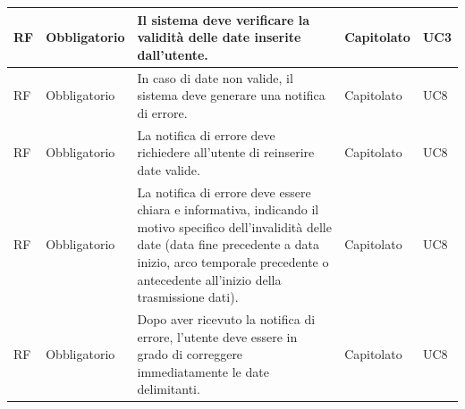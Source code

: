 \documentclass{article}
\begin{document}
\begin{longtable}{|C{1cm}|C{2cm}|>{\raggedright}m{5cm}|C{1.5cm}|C{2cm}|}
     RF & Obbligatorio        & Il sistema deve verificare la validità delle date inserite dall'utente.
                                                   & Capitolato          & UC3                                                                                                                                                                                                                                                                      \\
    \hline
     RF & Obbligatorio        & In caso di date non valide, il sistema deve generare una notifica di errore.
                                                   & Capitolato          & UC8                                                                                                                                                                                                                                                                      \\
    \hline
     RF & Obbligatorio        & La notifica di errore deve richiedere all'utente di reinserire date valide.
                                                   & Capitolato          & UC8                                                                                                                                                                                                                                                                      \\
    \hline
     RF & Obbligatorio        & La notifica di errore deve essere chiara e informativa, indicando il motivo specifico dell'invalidità delle date (data fine precedente a data inizio, arco temporale precedente o antecedente all'inizio della trasmissione dati).
                                                   & Capitolato          & UC8                                                                                                                                                                                                                                                                      \\
    \hline
     RF & Obbligatorio        & Dopo aver ricevuto la notifica di errore, l'utente deve essere in grado di correggere immediatamente le date delimitanti.
                                                   & Capitolato          & UC8                                                                                                                                                                                                                                                                      \\


\end{longtable}
\end{document}
